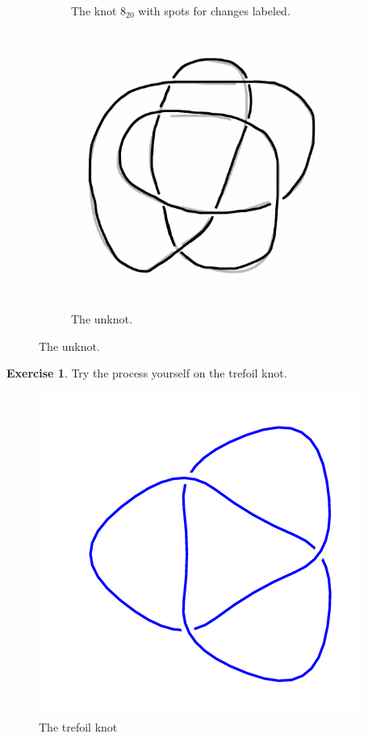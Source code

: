 \documentclass[12pt,letterpaper]{article}
\theoremstyle{definition}
\newtheorem{exercise}[question]{Exercise}
\begin{document}
\begin{figure}[h]
\begin{subfigure}{.3\textwidth}
        \caption{The knot $8_{20}$ with spots for changes labeled.}
    \end{subfigure}
    \begin{subfigure}{.3\textwidth}
        \centering
        \includegraphics[width=\textwidth]{rgp12pics/8-20-unknot.png}
        \caption{The unknot.}
    \end{subfigure}
\end{figure}

\clearpage

\begin{exercise}
Try the process yourself on the trefoil knot.
\end{exercise}

\begin{figure}[h]
    \centering
    \includegraphics[width=.4\textwidth]{rgp12pics/3_1.png}
    \caption{The trefoil knot}
\end{figure}
\end{document}
